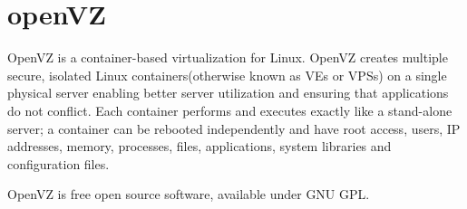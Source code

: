 \section{openVZ}
OpenVZ is a container-based virtualization for Linux. OpenVZ creates multiple
secure, isolated Linux containers(otherwise known as VEs or VPSs) on a single
physical server enabling better server utilization and ensuring that
applications do not conflict. Each container performs and executes exactly
like a stand-alone server; a container can be rebooted independently and have
root access, users, IP addresses, memory, processes, files, applications,
system libraries and configuration files.

OpenVZ is free open source software, available under GNU GPL\cite{www-openvz}. 
